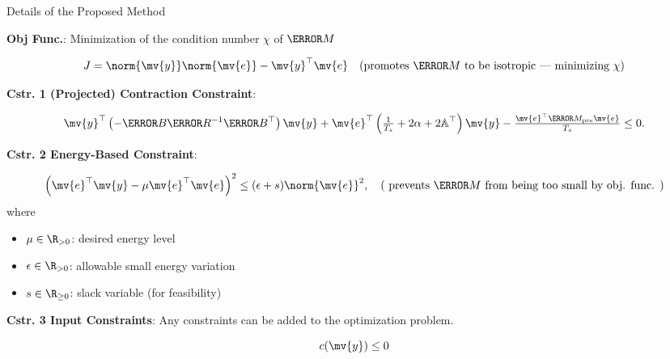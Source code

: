 \begin{frame}{\insertsubsectionhead}{Details of the Proposed Method}

  \textbf{Obj Func.}:
  Minimization of the condition number $\chi$ of $\mm{M}$

  \begin{equation}
    J = \norm{\mv{y}}\norm{\mv{e}} - \mv{y}^\top \mv{e}
    \quad
    (\text{promotes $\mm{M}$ to be isotropic — minimizing $\chi$})
  \end{equation}
    
  \textbf{Cstr. 1 (Projected) Contraction Constraint}:

  \begin{equation} \label{eq:cstr:ctrc:proj}
    \mv{y}^\top 
    \left(
      -\mm{B} \mm{R}^{-1} \mm{B}^\top
    \right)
    \mv{y}
    +
    \mv{e}^\top
    \left(
      \tfrac{1}{T_s}+2\alpha
      +
      2\mathbb{A}^\top
    \right)
    \mv{y}
    -
    \tfrac{\mv{e}^\top \mm{M}_{\rm{pre}} \mv{e}}{T_s}
    \le 0
    .
  \end{equation}

  \textbf{Cstr. 2 Energy-Based Constraint}: 

  \begin{equation} \label{eq:cstr:energy}
  \left(
    \mv{e}^\top \mv{y} 
    -
    \mu \mv{e}^\top \mv{e}
  \right)^2
  \le
  (\epsilon + s) \norm{\mv{e}}^2
  ,
  \quad
  (\text{
    prevents $\mm{M}$ from being too small by obj. func.
  })
  \end{equation}
  where 
  \begin{itemize}
    \item $\mu\in\R_{>0}$: desired energy level
    \item $\epsilon\in\R_{>0}$: allowable small energy variation
    \item $s\in\R_{\ge0}$: slack variable (for feasibility)
  \end{itemize}

  \textbf{Cstr. 3 Input Constraints}:
  Any constraints can be added to the optimization problem.

  \begin{equation}
    c(\mv{y}) \le 0
  \end{equation}

\end{frame}


